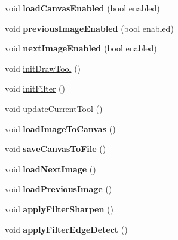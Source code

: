 \begin{DoxyCompactItemize}
\item 
\hypertarget{classMIAApp_ad1e12340d80aff74cd84757fa23abc25}{void {\bfseries load\-Canvas\-Enabled} (bool enabled)}\label{classMIAApp_ad1e12340d80aff74cd84757fa23abc25}

\item 
\hypertarget{classMIAApp_a14aff5b7c19330a72f0f94a838ffd05a}{void {\bfseries previous\-Image\-Enabled} (bool enabled)}\label{classMIAApp_a14aff5b7c19330a72f0f94a838ffd05a}

\item 
\hypertarget{classMIAApp_aea869031fb947572040fe6bdb4c9a6a5}{void {\bfseries next\-Image\-Enabled} (bool enabled)}\label{classMIAApp_aea869031fb947572040fe6bdb4c9a6a5}

\item 
void \hyperlink{classMIAApp_ae9f573664b63d839f34a97a55cfc305a}{init\-Draw\-Tool} ()
\item 
void \hyperlink{classMIAApp_a5f25e06a32d646e407474f24b8ecf43d}{init\-Filter} ()
\item 
void \hyperlink{classMIAApp_aef9e427d5b1279cf9e6fe4d17570a828}{update\-Current\-Tool} ()
\item 
\hypertarget{classMIAApp_a911e8d9fe5ef5d7c0fe4680eabd42052}{void {\bfseries load\-Image\-To\-Canvas} ()}\label{classMIAApp_a911e8d9fe5ef5d7c0fe4680eabd42052}

\item 
\hypertarget{classMIAApp_a4003f9ceb1dc298abf847f69ab259608}{void {\bfseries save\-Canvas\-To\-File} ()}\label{classMIAApp_a4003f9ceb1dc298abf847f69ab259608}

\item 
\hypertarget{classMIAApp_a57ef88e2558ed69fe0ee4296dbf21bd6}{void {\bfseries load\-Next\-Image} ()}\label{classMIAApp_a57ef88e2558ed69fe0ee4296dbf21bd6}

\item 
\hypertarget{classMIAApp_a0338ac2b7f4a79ce17f505673a7e4392}{void {\bfseries load\-Previous\-Image} ()}\label{classMIAApp_a0338ac2b7f4a79ce17f505673a7e4392}

\item 
\hypertarget{classMIAApp_ad1fc2f78000ae94b2a52b600af720af2}{void {\bfseries apply\-Filter\-Sharpen} ()}\label{classMIAApp_ad1fc2f78000ae94b2a52b600af720af2}

\item 
\hypertarget{classMIAApp_a0531d51f02e34337f5ef721aca1a5883}{void {\bfseries apply\-Filter\-Edge\-Detect} ()}\label{classMIAApp_a0531d51f02e34337f5ef721aca1a5883}


\end{DoxyCompactItemize}
